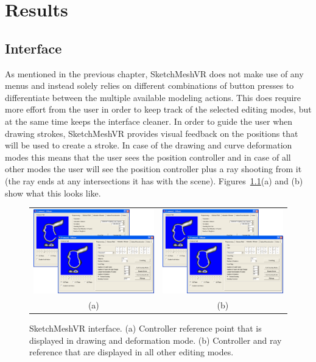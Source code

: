 \chapter{Results}
\label{chap:results}

\section{Interface}
As mentioned in the previous chapter, SketchMeshVR does not make use of any menus and instead solely relies on different combinations of button presses to differentiate between the multiple available modeling actions. This does require more effort from the user in order to keep track of the selected editing modes, but at the same time keeps the interface cleaner. In order to guide the user when drawing strokes, SketchMeshVR provides visual feedback on the positions that will be used to create a stroke. In case of the drawing and curve deformation modes this means that the user sees the position controller and in case of all other modes the user will see the position controller plus a ray shooting from it (the ray ends at any intersections it has with the scene). Figures~\ref{fig:interface}(a) and (b) show what this looks like.

\begin{figure}[!h]
    \centering
    \setlength{\tabcolsep}{0.0130\linewidth}
    \begin{tabular}{@{}cc@{}}
    \includegraphics[width=0.3\linewidth]{figures/voldiff_ui}&
  	\includegraphics[width=0.3\linewidth]{figures/voldiff_ui}\\
    (a)&(b)\\
    \end{tabular}
    \caption[SketchMeshVR interface]{SketchMeshVR interface.
    	  \textup{(a)} Controller reference point that is displayed in drawing and deformation mode.
			  \textup{(b)} Controller and ray reference that are displayed in all other editing modes. 
      \label{fig:interface}}
\end{figure}
 
